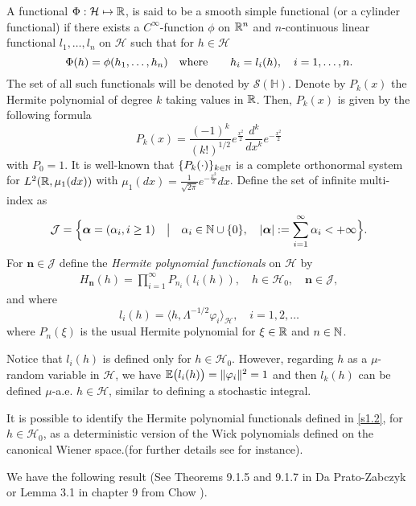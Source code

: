 \documentclass[review, onefignum, onetabnum]{siamart171218}
\begin{document}
    A functional $\Phi:\mathcal{H}\mapsto {\mathbb R}$, is said to be a smooth simple
functional (or a cylinder functional) if there exists a
$C^\infty$-function $\phi$ on ${\mathbb R}^n$ and $n$-continuous linear functional
$l_1,\ldots,l_n$ on $\mathcal{H}$ such that for
$h\in\mathcal{H}$
\begin{equation}
    \Phi(h)=\phi(h_1,\ldots,h_n)\quad
    \mbox{\rm where}\qquad h_i=l_i(h),\quad i=1,\ldots,n.\label{S1.2}
\end{equation}
The set of all such functionals will be denoted by $\mathcal{S}(\mathbb{H})$.
%
Denote by $P_k(x)$ the Hermite polynomial of degree $k$ taking values in
${\mathbb R}$. Then, $P_k(x)$ is given by the following formula
\[
     P_k(x)=\frac{(-1)^k}{(k!)^{1/2}} e^{\tfrac{x^2}{2}}
     \frac{d^k}{dx^k}e^{-\tfrac{x^2}{2}}
\]
with $P_0=1$. It is well-known that $\{P_k(\cdot)\}_{k\in{\mathbb N}}$ is a complete
orthonormal system for $L^2({\mathbb R},\mu_1(dx))$ with
$
    \mu_1(dx) =
        \tfrac{1}{\sqrt{2\pi}}
        e^{-\tfrac{x^2}{2}} dx
$.
Define the set of infinite multi-index as
\[
    \mathcal{J}=\Big\{\bm{\alpha}=(\alpha_i,i\ge 1)\quad \big|\quad\alpha_i\in
    {\mathbb N}\cup\{0\},\quad |\bm{\alpha}|:=\sum_{i=1}^\infty
    \alpha_i<+\infty  \Big\}.
\]
For $\bm{n}\in\mathcal{J} $ define the {\it Hermite polynomial functionals}
on $\mathcal{H}$ by
\begin{align}
    \label{s1.2}
    H_{\bm{n}}(h) = \prod_{i=1}^\infty P_{n_i}(l_i(h)),\quad
    h \in \mathcal{H}_0, \quad \bm{n} \in \mathcal{J},
\end{align}
and where
\[
    l_i(h) = \langle h,  \Lambda^{-1/2} \varphi_i \rangle_\mathcal{H}, \quad
    i=1,2,\ldots
\]
where $P_n(\xi)$ is the usual Hermite polynomial for  $\xi\in{\mathbb R}$ and
$n\in{\mathbb N}$.
%
\begin{remark}
    Notice that $l_i(h)$ is defined only for $h \in\mathcal{H}_0$. However,
    regarding $h$ as a $\mu$-random variable in
    $\mathcal{H}$, we have $\mathbb{E}\big(l_i (h)\big) = \|\varphi_i \|^2  = 1$ and
    then $l_k (h)$ can be defined $\mu$-a.e. $h \in\mathcal{H}$,
    similar to defining a stochastic integral.

    It is possible to identify the Hermite polynomial functionals
    defined in \eqref{s1.2}, for $h \in\mathcal{H}_0$, as a deterministic
    version of the Wick polynomials defined on the canonical Wiener space.(for
    further details see \cite{im} for instance).
\end{remark}

    We have the following result (See Theorems 9.1.5 and 9.1.7 in Da
Prato-Zabczyk \cite{da-za} or Lemma 3.1 in chapter 9 from Chow \cite{liu}).
\end{document}
